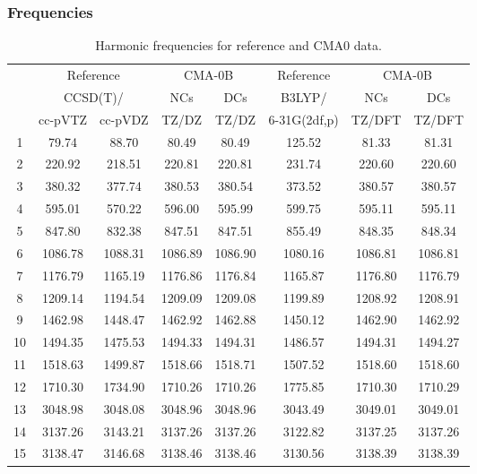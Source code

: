 \documentclass[10pt,oneside]{article}
\begin{document}
\subsubsection*{Frequencies}
\begin{table}[h!]
\centering
\caption{Harmonic frequencies for reference and CMA0 data.}
\begin{tabular}{cccccccc}
\toprule
{} & \multicolumn{2}{c}{Reference} & \multicolumn{2}{c}{CMA-0B} &    Reference & \multicolumn{2}{c}{CMA-0B} \\
{} & \multicolumn{2}{c}{CCSD(T)/} &     NCs &     DCs &       B3LYP/ &     NCs &     DCs \\
{} &   cc-pVTZ & cc-pVDZ &   TZ/DZ &   TZ/DZ & 6-31G(2df,p) &  TZ/DFT &  TZ/DFT \\
\midrule
1  &     79.74 &   88.70 &   80.49 &   80.49 &       125.52 &   81.33 &   81.31 \\
2  &    220.92 &  218.51 &  220.81 &  220.81 &       231.74 &  220.60 &  220.60 \\
3  &    380.32 &  377.74 &  380.53 &  380.54 &       373.52 &  380.57 &  380.57 \\
4  &    595.01 &  570.22 &  596.00 &  595.99 &       599.75 &  595.11 &  595.11 \\
5  &    847.80 &  832.38 &  847.51 &  847.51 &       855.49 &  848.35 &  848.34 \\
6  &   1086.78 & 1088.31 & 1086.89 & 1086.90 &      1080.16 & 1086.81 & 1086.81 \\
7  &   1176.79 & 1165.19 & 1176.86 & 1176.84 &      1165.87 & 1176.80 & 1176.79 \\
8  &   1209.14 & 1194.54 & 1209.09 & 1209.08 &      1199.89 & 1208.92 & 1208.91 \\
9  &   1462.98 & 1448.47 & 1462.92 & 1462.88 &      1450.12 & 1462.90 & 1462.92 \\
10 &   1494.35 & 1475.53 & 1494.33 & 1494.31 &      1486.57 & 1494.31 & 1494.27 \\
11 &   1518.63 & 1499.87 & 1518.66 & 1518.71 &      1507.52 & 1518.60 & 1518.60 \\
12 &   1710.30 & 1734.90 & 1710.26 & 1710.26 &      1775.85 & 1710.30 & 1710.29 \\
13 &   3048.98 & 3048.08 & 3048.96 & 3048.96 &      3043.49 & 3049.01 & 3049.01 \\
14 &   3137.26 & 3143.21 & 3137.26 & 3137.26 &      3122.82 & 3137.25 & 3137.26 \\
15 &   3138.47 & 3146.68 & 3138.46 & 3138.46 &      3130.56 & 3138.39 & 3138.39 \\
\bottomrule
\end{tabular}
\end{table}
\end{document}
